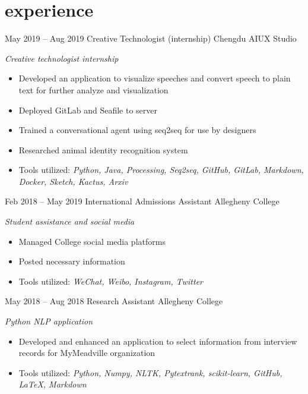 \documentclass[]{friggeri-cv}
\begin{document}
\section{experience}
\begin{entrylist}
  \entry
    {May 2019 -- Aug 2019}
    {Creative Technologist (internship)}
    {Chengdu AIUX Studio}
    {\emph{Creative technologist internship}
    \begin{itemize}[leftmargin=1.2em]
    \item Developed an application to visualize speeches and convert speech to plain text for further analyze and visualization
    \item Deployed GitLab and Seafile to server
    \item Trained a conversational agent using seq2seq for use by designers
    \item Researched animal identity recognition system
    \item Tools utilized: \emph{Python, Java, Processing, Seq2seq, GitHub, GitLab, Markdown, Docker, Sketch, Kactus, Arxiv}
    \end{itemize}}
  \entry
    {Feb 2018 -- May 2019}
    {International Admissions Assistant}
    {Allegheny College}
    {\emph{Student assistance and social media}
    \begin{itemize}[leftmargin=1.2em]
    \item Managed College social media platforms
    \item Posted necessary information
    \item Tools utilized: \emph{WeChat, Weibo, Instagram, Twitter}
    \end{itemize}}
  \entry
    {May 2018 -- Aug 2018}
    {Research Assistant}
    {Allegheny College}
    {\emph{Python NLP application}
    \begin{itemize}[leftmargin=1.2em]
    \item Developed and enhanced an application to select information from interview records for MyMeadville organization
    \item Tools utilized: \emph{Python, Numpy, NLTK, Pytextrank, scikit-learn, GitHub, \LaTeX, Markdown}
    \end{itemize}}
\end{entrylist}
\end{document}
